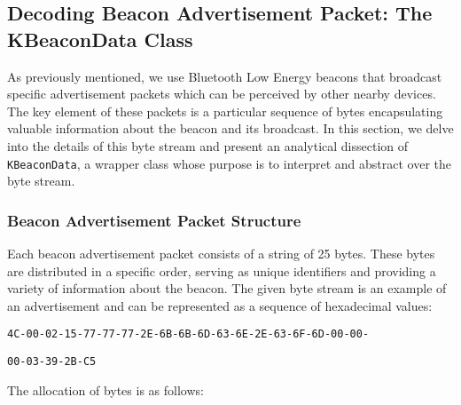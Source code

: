 \subsection{Decoding Beacon Advertisement Packet: The KBeaconData Class}

As previously mentioned, we use Bluetooth Low Energy beacons that broadcast specific advertisement packets which can be perceived by other nearby devices.
The key element of these packets is a particular sequence of bytes encapsulating valuable information about the beacon and its broadcast. 
In this section, we delve into the details of this byte stream and present an analytical dissection of \texttt{KBeaconData}, a wrapper class whose purpose is to interpret and abstract over the byte stream.

\subsubsection{Beacon Advertisement Packet Structure}
	 
Each beacon advertisement packet consists of a string of 25 bytes.
These bytes are distributed in a specific order, serving as unique identifiers and providing a variety of information about the beacon. 
The given byte stream is an example of an advertisement and can be represented as a sequence of hexadecimal values:


\noindent\texttt{4C-00-02-15-77-77-77-2E-6B-6B-6D-63-6E-2E-63-6F-6D-00-00-}


\noindent\texttt{00-03-39-2B-C5}


The allocation of bytes is as follows:

